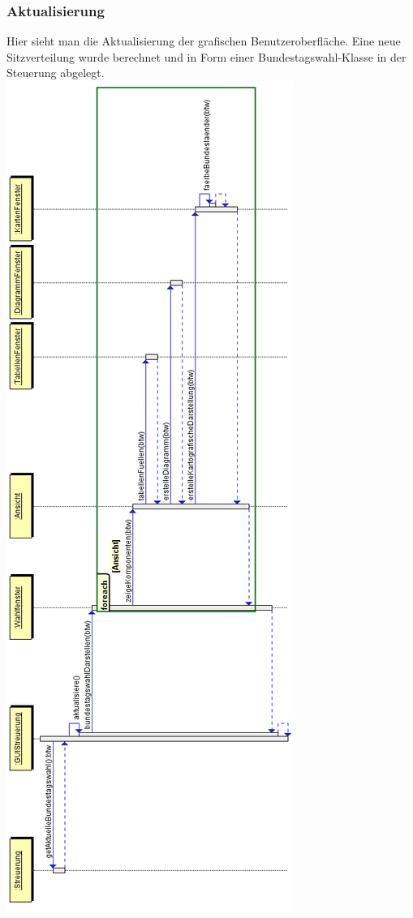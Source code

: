 \documentclass[12pt,a4paper,titlepage]{article}
\begin{document}
\subsubsection{Aktualisierung}
Hier sieht man die Aktualisierung der grafischen Benutzeroberfläche. Eine neue Sitzverteilung wurde berechnet und in Form einer Bundestagswahl-Klasse in der Steuerung abgelegt. \\
\includegraphics[scale=0.5]{GUI_Aktualisierung.png}
\end{document}
